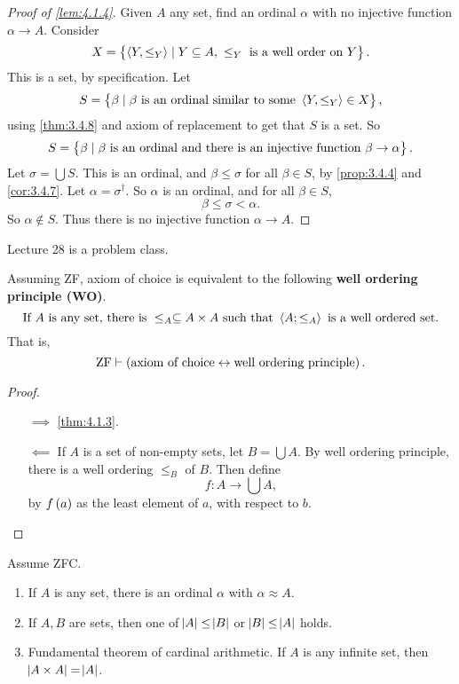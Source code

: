 \begin{proof}[Proof of \ref{lem:4.1.4}]
Given $ A $ any set, find an ordinal $ \alpha $ with no injective function $ \alpha \to A $. Consider
$$ X = \cbr{\abr{Y, \le_Y} \mid Y \subseteq A, \ \le_Y \ \text{is a well order on} \ Y}. $$
This is a set, by specification. Let
$$ S = \cbr{\beta \mid \beta \ \text{is an ordinal similar to some} \ \abr{Y, \le_Y} \in X}, $$
using \ref{thm:3.4.8} and axiom of replacement to get that $ S $ is a set. So
$$ S = \cbr{\beta \mid \beta \ \text{is an ordinal and there is an injective function} \ \beta \to \alpha}. $$
Let $ \sigma = \bigcup S $. This is an ordinal, and $ \beta \le \sigma $ for all $ \beta \in S $, by \ref{prop:3.4.4} and \ref{cor:3.4.7}. Let $ \alpha = \sigma^\dagger $. So $ \alpha $ is an ordinal, and for all $ \beta \in S $,
$$ \beta \le \sigma < \alpha. $$
So $ \alpha \notin S $. Thus there is no injective function $ \alpha \to A $.
\end{proof}


Lecture 28 is a problem class.


\begin{corollary}
Assuming ZF, axiom of choice is equivalent to the following \textbf{well ordering principle (WO)}.
$$ \text{If} \ A \ \text{is any set, there is} \ \le_A \subseteq A \times A \ \text{such that} \ \abr{A; \le_A} \ \text{is a well ordered set}. $$
That is,
$$ \text{ZF} \vdash \iffb{\text{axiom of choice}}{\text{well ordering principle}}. $$
\end{corollary}

\begin{proof}
\hfill
\begin{itemize}
\item[$ \implies $] \ref{thm:4.1.3}.
\item[$ \impliedby $] If $ A $ is a set of non-empty sets, let $ B = \bigcup A $. By well ordering principle, there is a well ordering $ \le_B $ of $ B $. Then define
$$ f : A \to \bigcup A, $$
by $ f\br{a} $ as the least element of $ a $, with respect to $ b $.
\end{itemize}
\end{proof}

\begin{corollary}
\label{cor:4.1.6}
Assume ZFC.
\begin{enumerate}
\item If $ A $ is any set, there is an ordinal $ \alpha $ with $ \alpha \approx A $.
\item If $ A, B $ are sets, then one of $ \abs{A} \le \abs{B} $ or $ \abs{B} \le \abs{A} $ holds.
\item Fundamental theorem of cardinal arithmetic. If $ A $ is any infinite set, then $ \abs{A \times A} = \abs{A} $.
\end{enumerate}
\end{corollary}

